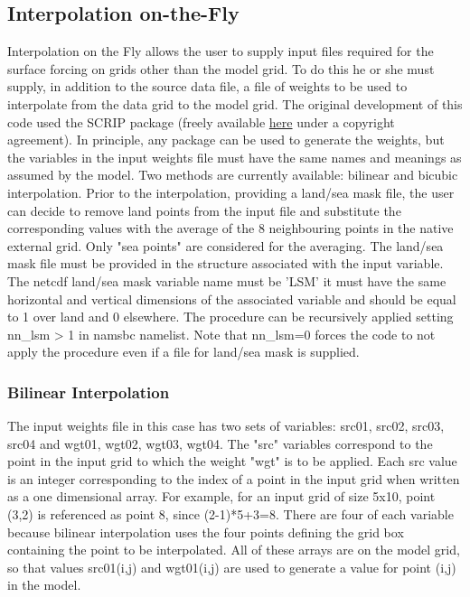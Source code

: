 \documentclass[NEMO_book]{subfiles}
\begin{document}
\subsection [Interpolation on-the-Fly] {Interpolation on-the-Fly}
\label{SBC_iof}

Interpolation on the Fly allows the user to supply input files required
for the surface forcing on grids other than the model grid.
To do this he or she must supply, in addition to the source data file,
a file of weights to be used to interpolate from the data grid to the model grid.
The original development of this code used the SCRIP package (freely available 
\href{http://climate.lanl.gov/Software/SCRIP}{here} under a copyright agreement).
In principle, any package can be used to generate the weights, but the
variables in the input weights file must have the same names and meanings as
assumed by the model.
Two methods are currently available: bilinear and bicubic interpolation.
Prior to the interpolation, providing a land/sea mask file, the user can decide to
 remove land points from the input file and substitute the corresponding values 
with the average of the 8 neighbouring points in the native external grid.
 Only "sea points" are considered for the averaging. The land/sea mask file must 
be provided in the structure associated with the input variable.
 The netcdf land/sea mask variable name must be 'LSM' it must have the same 
horizontal and vertical dimensions of the associated variable and should 
be equal to 1 over land and 0 elsewhere.
The procedure can be recursively applied setting nn\_lsm > 1 in namsbc namelist. 
Note that nn\_lsm=0 forces the code to not apply the procedure even if a file for land/sea mask is supplied.

\subsubsection{Bilinear Interpolation}
\label{SBC_iof_bilinear}

The input weights file in this case has two sets of variables: src01, src02,
src03, src04 and wgt01, wgt02, wgt03, wgt04.
The "src" variables correspond to the point in the input grid to which the weight
"wgt" is to be applied. Each src value is an integer corresponding to the index of a 
point in the input grid when written as a one dimensional array.  For example, for an input grid
of size 5x10, point (3,2) is referenced as point 8, since (2-1)*5+3=8.
There are four of each variable because bilinear interpolation uses the four points defining
the grid box containing the point to be interpolated.
All of these arrays are on the model grid, so that values src01(i,j) and
wgt01(i,j) are used to generate a value for point (i,j) in the model.
\end{document}
